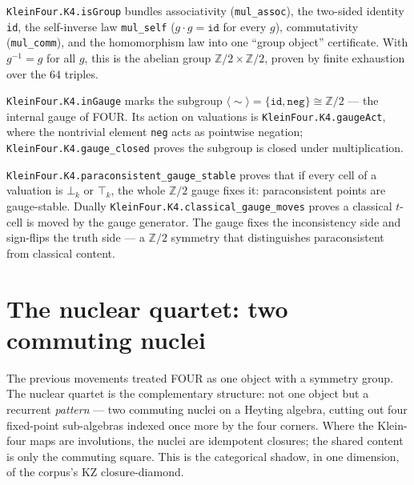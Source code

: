 \begin{theorem}\label{thm:k4-isgroup}\leanok{}
\texttt{KleinFour.K4.isGroup} bundles associativity (\texttt{mul\_assoc}), the two-sided identity \texttt{id}, the self-inverse law \texttt{mul\_self} ($g \cdot g = \texttt{id}$ for every $g$), commutativity (\texttt{mul\_comm}), and the homomorphism law into one ``group object'' certificate. With $g^{-1} = g$ for all $g$, this is the abelian group $\mathbb{Z}/2 \times \mathbb{Z}/2$, proven by finite exhaustion over the $64$ triples.
\end{theorem}

\begin{definition}\label{def:gauge}\leanok{}
\texttt{KleinFour.K4.inGauge} marks the subgroup $\langle\sim\rangle = \{\texttt{id}, \texttt{neg}\} \cong \mathbb{Z}/2$ --- the internal gauge of FOUR. Its action on valuations is \texttt{KleinFour.K4.gaugeAct}, where the nontrivial element \texttt{neg} acts as pointwise negation; \texttt{KleinFour.K4.gauge\_closed} proves the subgroup is closed under multiplication.
\end{definition}

\begin{theorem}\label{thm:gauge-stable}\leanok{}
\texttt{KleinFour.K4.paraconsistent\_gauge\_stable} proves that if every cell of a valuation is $\bot_k$ or $\top_k$, the whole $\mathbb{Z}/2$ gauge fixes it: paraconsistent points are gauge-stable. Dually \texttt{KleinFour.K4.classical\_gauge\_moves} proves a classical $t$-cell is moved by the gauge generator. The gauge fixes the inconsistency side and sign-flips the truth side --- a $\mathbb{Z}/2$ symmetry that distinguishes paraconsistent from classical content.
\end{theorem}

\section{The nuclear quartet: two commuting nuclei}

The previous movements treated FOUR as one object with a symmetry group. The nuclear quartet is the complementary structure: not one object but a recurrent \emph{pattern} --- two commuting nuclei on a Heyting algebra, cutting out four fixed-point sub-algebras indexed once more by the four corners. Where the Klein-four maps are involutions, the nuclei are idempotent closures; the shared content is only the commuting square. This is the categorical shadow, in one dimension, of the corpus's KZ closure-diamond.

